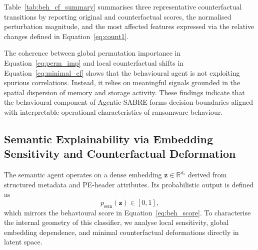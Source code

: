 \documentclass[lettersize,journal]{IEEEtran}
\begin{document}
Table~\ref{tab:beh_cf_summary} summarises three representative counterfactual transitions by reporting original and counterfactual scores, the normalised perturbation magnitude, and the most affected features expressed via the relative changes defined in Equation~\eqref{eq:count1}.

\begin{table}[t]
\centering
{}
\caption{Representative behavioural counterfactuals generated using the minimal-perturbation formulation in Equation~\eqref{eq:minimal_cf}. Relative changes are computed using Equation~\eqref{eq:count1}.}
\label{tab:beh_cf_summary}
\end{table}

The coherence between global permutation importance in Equation~\eqref{eq:perm_imp} and local counterfactual shifts in Equation~\eqref{eq:minimal_cf} shows that the behavioural agent is not exploiting spurious correlations. Instead, it relies on meaningful signals grounded in the spatial dispersion of memory and storage activity. These findings indicate that the behavioural component of Agentic-SABRE forms decision boundaries aligned with interpretable operational characteristics of ransomware behaviour.

\subsection{Semantic Explainability via Embedding Sensitivity and Counterfactual Deformation}
\label{sec:semantic_explainability}

The semantic agent operates on a dense embedding $\mathbf{z}\in\mathbb{R}^{d_s}$ derived from structured metadata and PE-header attributes.
Its probabilistic output is defined as
\begin{equation}
p_{\mathrm{sem}}(\mathbf{z}) \in [0,1],
\label{eq:sem_pred}
\end{equation}
which mirrors the behavioural score in Equation~\eqref{eq:beh_score}.
To characterise the internal geometry of this classifier, we analyse local sensitivity,
global embedding dependence, and minimal counterfactual deformations directly in latent space.
\end{document}

